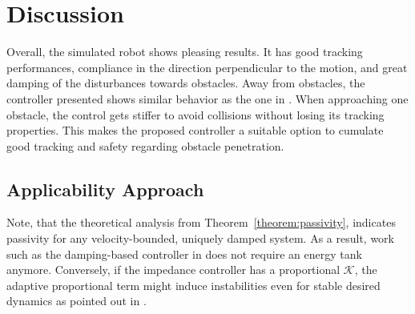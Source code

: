 \section{Discussion}
Overall, the simulated robot shows pleasing results. It has good tracking performances, compliance in the direction perpendicular to the motion, and great damping of the disturbances towards obstacles.
Away from obstacles, the controller presented shows similar behavior as the one in \cite{kronander2015passive}. When approaching one obstacle, the control gets stiffer to avoid collisions without losing its tracking properties. This makes the proposed controller a suitable option to cumulate good tracking and safety regarding obstacle penetration.

\subsection{Applicability Approach}
Note, that the theoretical analysis from Theorem~\ref{theorem:passivity}, indicates passivity for any velocity-bounded, uniquely damped system. As a result, work such as the damping-based controller in  \cite{kronander2015passive} does not require an energy tank anymore.
Conversely, if the impedance controller has a proportional $\mathcal{K}$, the adaptive proportional term might induce instabilities even for stable desired dynamics as pointed out in \cite{ferraguti2013tank, kronander2016stability}.